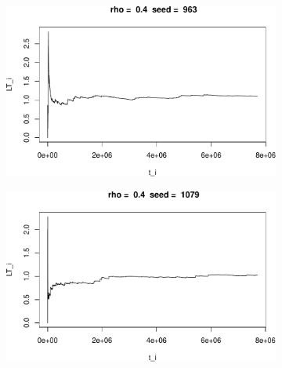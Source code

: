 \documentclass[]{article}
\begin{document}
\begin{figure}[h!]
\begin{subfigure}[b]{.55\linewidth}

\includegraphics[width=\linewidth]{003_files/figure-latex/unnamed-chunk-14-3.pdf}
\end{subfigure}\hfill
\begin{subfigure}[b]{.55\linewidth}
\includegraphics[width=\linewidth]{003_files/figure-latex/unnamed-chunk-14-4.pdf}
\end{subfigure}\vfill
\end{figure}
\end{document}
